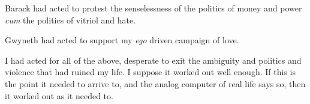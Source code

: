 

Barack had acted to protest the senselessness of the politics of money
and power {\it cum} the politics of vitriol and hate.

Gwyneth had acted to support my {\it ego} driven campaign of love.

I had acted for all of the above, desperate to exit the ambiguity and
politics and violence that had ruined my life.  I suppose it worked
out well enough.  If this is the point it needed to arrive to, and the
analog computer of real life says so, then it worked out as it needed
to.

\bye
